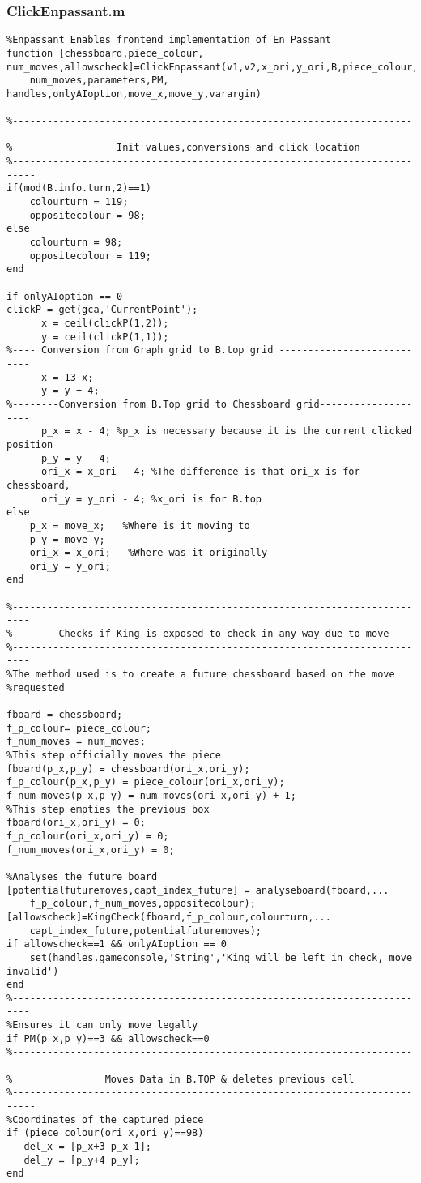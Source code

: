 \documentclass{article}
\begin{document}
\subsubsection{ClickEnpassant.m}
\begin{lstlisting}
%Enpassant Enables frontend implementation of En Passant
function [chessboard,piece_colour, num_moves,allowscheck]=ClickEnpassant(v1,v2,x_ori,y_ori,B,piece_colour,chessboard,...
    num_moves,parameters,PM, handles,onlyAIoption,move_x,move_y,varargin)

%--------------------------------------------------------------------------
%                  Init values,conversions and click location
%--------------------------------------------------------------------------
if(mod(B.info.turn,2)==1)
    colourturn = 119;
    oppositecolour = 98;
else
    colourturn = 98;
    oppositecolour = 119;
end

if onlyAIoption == 0
clickP = get(gca,'CurrentPoint');
      x = ceil(clickP(1,2));
      y = ceil(clickP(1,1));
%---- Conversion from Graph grid to B.top grid ---------------------------
      x = 13-x;      
      y = y + 4;
%--------Conversion from B.Top grid to Chessboard grid--------------------
      p_x = x - 4; %p_x is necessary because it is the current clicked position
      p_y = y - 4;
      ori_x = x_ori - 4; %The difference is that ori_x is for chessboard,
      ori_y = y_ori - 4; %x_ori is for B.top
else
    p_x = move_x;   %Where is it moving to
    p_y = move_y;
    ori_x = x_ori;   %Where was it originally
    ori_y = y_ori;
end

%-------------------------------------------------------------------------
%        Checks if King is exposed to check in any way due to move
%-------------------------------------------------------------------------
%The method used is to create a future chessboard based on the move
%requested

fboard = chessboard;
f_p_colour= piece_colour;
f_num_moves = num_moves;
%This step officially moves the piece
fboard(p_x,p_y) = chessboard(ori_x,ori_y);
f_p_colour(p_x,p_y) = piece_colour(ori_x,ori_y);
f_num_moves(p_x,p_y) = num_moves(ori_x,ori_y) + 1;
%This step empties the previous box
fboard(ori_x,ori_y) = 0;
f_p_colour(ori_x,ori_y) = 0;
f_num_moves(ori_x,ori_y) = 0;

%Analyses the future board
[potentialfuturemoves,capt_index_future] = analyseboard(fboard,...
    f_p_colour,f_num_moves,oppositecolour);
[allowscheck]=KingCheck(fboard,f_p_colour,colourturn,...
    capt_index_future,potentialfuturemoves);
if allowscheck==1 && onlyAIoption == 0
    set(handles.gameconsole,'String','King will be left in check, move invalid')
end
%-------------------------------------------------------------------------
%Ensures it can only move legally
if PM(p_x,p_y)==3 && allowscheck==0
%--------------------------------------------------------------------------
%                Moves Data in B.TOP & deletes previous cell
%--------------------------------------------------------------------------
%Coordinates of the captured piece
if (piece_colour(ori_x,ori_y)==98)
   del_x = [p_x+3 p_x-1];
   del_y = [p_y+4 p_y];
end
   

\end{lstlisting}
\end{document}
